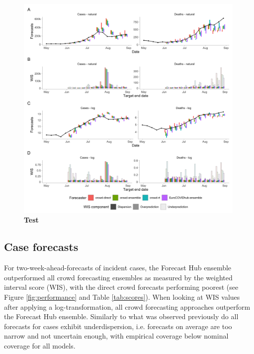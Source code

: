 \documentclass[10pt,a4paper,twocolumn]{article}
\begin{document}

\begin{figure}[H]
\centering
\includegraphics[width=0.99\textwidth]{../output/figures/scores-and-forecasts.png}
\caption{\bf{Test}}
\label{fig:forecasts-scores}
\end{figure}

\subsection*{Case forecasts}

For two-week-ahead-forecasts of incident cases, the Forecast Hub ensemble outperformed all crowd forecasting ensembles as measured by the weighted interval score (WIS), with the direct crowd forecasts performing poorest (see Figure \ref{fig:performance} and Table \ref{tab:scores}). When looking at WIS values after applying a log-transformation, all crowd forecasting approaches outperform the Forecast Hub ensemble. Similarly to what was observed previously \citep{bosseComparingHumanModelbased2022, sherrattPredictivePerformanceMultimodel2022a} do all forecasts for cases exhibit underdispersion, i.e. forecasts on average are too narrow and not uncertain enough, with empirical coverage below nominal coverage for all models. 
\end{document}
